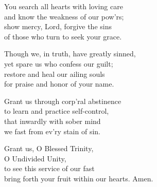 
You search all hearts with loving care\\
and know the weakness of our pow’rs;\\
show mercy, Lord, forgive the sins\\
of those who turn to seek your grace.

Though we, in truth, have greatly sinned,\\
yet spare us who confess our guilt;\\
restore and heal our ailing souls\\
for praise and honor of your name.

Grant us through corp’ral abstinence\\
to learn and practice self-control,\\
that inwardly with sober mind\\
we fast from ev’ry stain of sin.

Grant us, O Blessed Trinity,\\
O Undivided Unity,\\
to see this service of our fast\\
bring forth your fruit within our hearts. Amen.